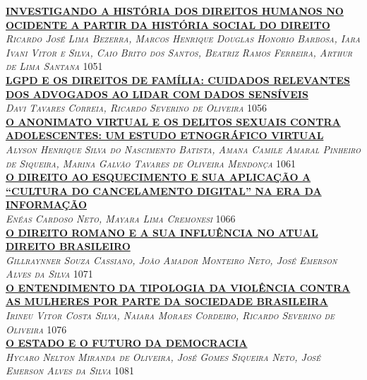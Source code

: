 \noindent \textsc{\hyperlink{trabalhos/250571.pdf.1}{\textbf{INVESTIGANDO A HISTÓRIA DOS DIREITOS HUMANOS NO OCIDENTE A PARTIR DA HISTÓRIA SOCIAL DO DIREITO  }}}\\ 
\noindent \textsc{\textit{Ricardo José Lima Bezerra, Marcos Henrique Douglas Honorio Barbosa, Iara Ivani Vitor e Silva, Caio Brito dos Santos, Beatriz Ramos Ferreira, Arthur de Lima Santana}} \hfill 1051\\ 

\noindent \textsc{\hyperlink{trabalhos/250638.pdf.1}{\textbf{LGPD E OS DIREITOS DE FAMÍLIA: CUIDADOS RELEVANTES DOS ADVOGADOS AO LIDAR COM DADOS SENSÍVEIS}}}\\ 
\noindent \textsc{\textit{Davi Tavares Correia, Ricardo Severino de Oliveira}} \hfill 1056\\ 

\noindent \textsc{\hyperlink{trabalhos/248857.pdf.1}{\textbf{O ANONIMATO VIRTUAL E OS DELITOS SEXUAIS CONTRA ADOLESCENTES: UM ESTUDO ETNOGRÁFICO VIRTUAL }}}\\ 
\noindent \textsc{\textit{Alyson Henrique Silva do Nascimento Batista, Amana Camile Amaral Pinheiro de Siqueira, Marina Galvão Tavares de Oliveira Mendonça}} \hfill 1061\\ 

\noindent \textsc{\hyperlink{trabalhos/244429.pdf.1}{\textbf{O DIREITO AO ESQUECIMENTO E SUA APLICAÇÃO A “CULTURA DO CANCELAMENTO DIGITAL” NA ERA DA INFORMAÇÃO}}}\\ 
\noindent \textsc{\textit{Enéas Cardoso Neto, Mayara Lima Cremonesi}} \hfill 1066\\ 

\noindent \textsc{\hyperlink{trabalhos/251428.pdf.1}{\textbf{O DIREITO ROMANO E A SUA INFLUÊNCIA NO ATUAL DIREITO BRASILEIRO}}}\\ 
\noindent \textsc{\textit{Gillraynner Souza Cassiano, João Amador Monteiro Neto, José Emerson Alves da Silva}} \hfill 1071\\ 

\noindent \textsc{\hyperlink{trabalhos/251663.pdf.1}{\textbf{O ENTENDIMENTO DA TIPOLOGIA DA VIOLÊNCIA CONTRA AS MULHERES POR PARTE DA SOCIEDADE BRASILEIRA}}}\\ 
\noindent \textsc{\textit{Irineu Vitor Costa Silva, Naiara Moraes Cordeiro, Ricardo Severino de Oliveira}} \hfill 1076\\ 

\noindent \textsc{\hyperlink{trabalhos/251591.pdf.1}{\textbf{O ESTADO E O FUTURO DA DEMOCRACIA }}}\\ 
\noindent \textsc{\textit{Hycaro Nelton Miranda de Oliveira, José Gomes Siqueira Neto, José Emerson Alves da Silva}} \hfill 1081\\ 

